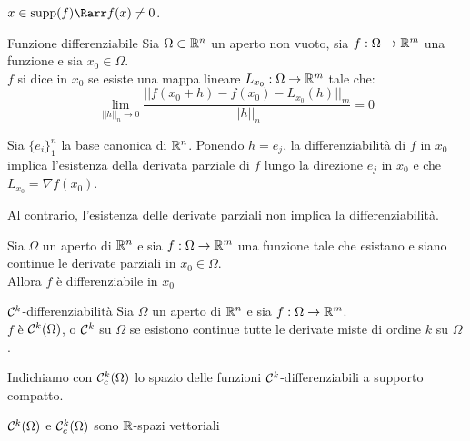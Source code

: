 \documentclass{article}
\begin{document}
\begin{remark}{}{}
    $x \in \supp(f) \Rarr f(x)\neq 0$.
\end{remark}

\begin{definition}{Funzione differenziabile}{}
    Sia $\Omega\subset \mathbb{R}^n$ un aperto non vuoto, sia $f:\Omega\to\mathbb{R}^m$ una funzione e sia $x_0\in\Omega$.\\
    $f$ si dice  in $x_0$ se esiste una mappa lineare $L_{x_0} : \Omega\to\mathbb{R}^m$ tale che:
    \[\lim_{||h||_n \to 0} \frac{||f(x_0 + h) - f(x_0) - L_{x_0}(h)||_m}{||h||_n} = 0\]
\end{definition}

\begin{remark}{}{}
    Sia $\{e_i\}_1^n$ la base canonica di $\mathbb{R}^n$. Ponendo $h=e_j$, la differenziabilità di $f$ in $x_0$ implica l'esistenza della derivata parziale di $f$ lungo la direzione $e_j$ in $x_0$ e che $L_{x_0} = \nabla f (x_0)$.
\end{remark}

\begin{remark}{}{}
    Al contrario, l'esistenza delle derivate parziali non implica la differenziabilità.
\end{remark}

\begin{proposition}{}{}
    Sia $\Omega$ un aperto di $\mathbb{R}^n$ e sia $f:\Omega\to\mathbb{R}^m$ una funzione tale che esistano e siano continue le derivate parziali in $x_0\in\Omega$.\\
    Allora $f$ è differenziabile in $x_0$
\end{proposition}

\begin{definition}{$\mathcal{C}^k$-differenziabilità}{}
    Sia $\Omega$ un aperto di $\mathbb{R}^n$ e sia $f:\Omega\to\mathbb{R}^m$.\\
    $f$ è $\mathcal{C}^k(\Omega)$, o $\mathcal{C}^k$ su $\Omega$ se esistono continue tutte le derivate miste di ordine $k$ su $\Omega$.
\end{definition}

\begin{notation}
    Indichiamo con $\mathcal{C}_c^k(\Omega)$ lo spazio delle funzioni $\mathcal{C}^k$-differenziabili a supporto compatto.
\end{notation}

\begin{remark}{}{}
    $\mathcal{C}^k(\Omega)$ e $\mathcal{C}_c^k(\Omega)$ sono $\mathbb{R}$-spazi vettoriali
\end{remark}
\end{document}
